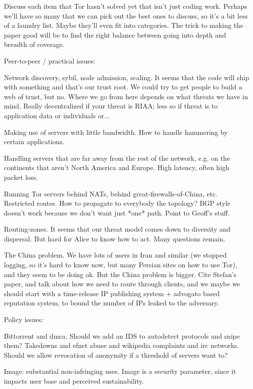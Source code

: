 \documentclass[twocolumn]{article}
\begin{document}
Discuss each item that Tor hasn't solved yet that isn't just coding
work.  Perhaps we'll have so many that we can pick out the best ones to
discuss, so it's a bit less of a laundry list. Maybe they'll even fit
into categories. The trick to making the paper good will be to find
the right balance between going into depth and breadth of coverage.


Peer-to-peer / practical issues:

Network discovery, sybil, node admission, scaling. It seems that the code
will ship with something and that's our trust root. We could try to get
people to build a web of trust, but no. Where we go from here depends
on what threats we have in mind. Really decentralized if your threat is
RIAA; less so if threat is to application data or individuals or...

Making use of servers with little bandwidth. How to handle hammering by
certain applications.

Handling servers that are far away from the rest of the network, e.g. on
the continents that aren't North America and Europe. High latency,
often high packet loss.

Running Tor servers behind NATs, behind great-firewalls-of-China, etc.
Restricted routes. How to propagate to everybody the topology? BGP
style doesn't work because we don't want just *one* path. Point to
Geoff's stuff.

Routing-zones. It seems that our threat model comes down to diversity and
dispersal. But hard for Alice to know how to act. Many questions remain.

The China problem. We have lots of users in Iran and similar (we stopped
logging, so it's hard to know now, but many Persian sites on how to use
Tor), and they seem to be doing ok. But the China problem is bigger. Cite
Stefan's paper, and talk about how we need to route through clients,
and we maybe we should start with a time-release IP publishing system +
advogato based reputation system, to bound the number of IPs leaked to the
adversary.


Policy issues:

Bittorrent and dmca. Should we add an IDS to autodetect protocols and
snipe them? Takedowns and efnet abuse and wikipedia complaints and irc
networks. Should we allow revocation of anonymity if a threshold of
servers want to?

Image: substantial non-infringing uses. Image is a security parameter,
since it impacts user base and perceived sustainability.
\end{document}
